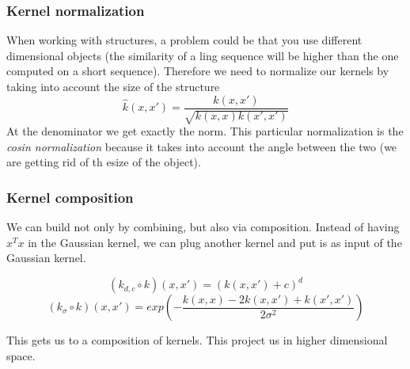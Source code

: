         \subsubsection{Kernel normalization}
            When working with structures, a problem could be that you use different dimensional objects (the similarity of a ling sequence will be higher than the one computed on a short sequence). 
            Therefore we need to normalize our kernels by taking into account the size of the structure
            $$\hat{k}(x,x') = \frac{k(x,x')}{\sqrt{k(x,x)k(x',x')}}$$
            At the denominator we get exactly the norm. 
            This particular normalization is the \textit{cosin normalization} because it takes into account the angle between the two (we are getting rid of th esize of the object). 

        \subsubsection{Kernel composition}
            We can build not only by combining, but also via composition. Instead of having $x^T x$ in the Gaussian kernel, we can plug another kernel and put is as input of the Gaussian kernel. 
            
    		$$(k_{d,c}\circ k)(x,x') = (k(x,x')+c)^d$$
    		$$(k_\sigma\circ k)(x,x') = exp\left({-\frac{k(x,x)-2k(x,x')+k(x',x')}{2\sigma^2}}\right)$$

            This gets us to a composition of kernels. This project us in higher dimensional space. 
            
            